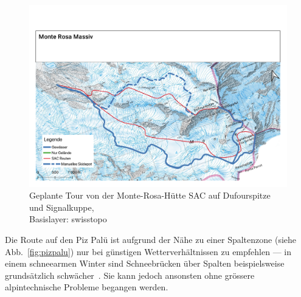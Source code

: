 \begin{figure}[ht]
  \centering
  \includegraphics[page=1,width=.9\linewidth]{./../evaluation/PDFs/Monte Rosa Massiv.pdf}
  \caption{Geplante Tour von der Monte-Rosa-Hütte SAC auf Dufourspitze und Signalkuppe,\\Basislayer: swisstopo}\label{fig:monterosa}
\end{figure}

Die Route auf den Piz Palü ist aufgrund der Nähe zu einer Spaltenzone (siehe Abb.\ \ref{fig:pizpalu}) nur bei günstigen Wetterverhältnissen zu empfehlen --- in einem schneearmen Winter sind Schneebrücken über Spalten beispielsweise grundsätzlich schwächer~\cite{bergsteigenErhhtesRisiko}. Sie kann jedoch ansonsten ohne grössere alpintechnische Probleme begangen werden.

